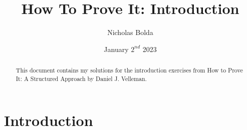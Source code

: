 \documentclass[12pt]{article}
\title{How To Prove It: Introduction}
\author{Nicholas Bolda}
\date{January \(2^{nd}\) 2023}
\begin{document}
\markboth{\theauthor}{\thetitle}

\maketitle

\begin{abstract}
    This document contains my solutions for the introduction exercises from How to Prove It: A Structured Approach by Daniel J. Velleman.
\end{abstract}

\section{Introduction}
\end{document}
